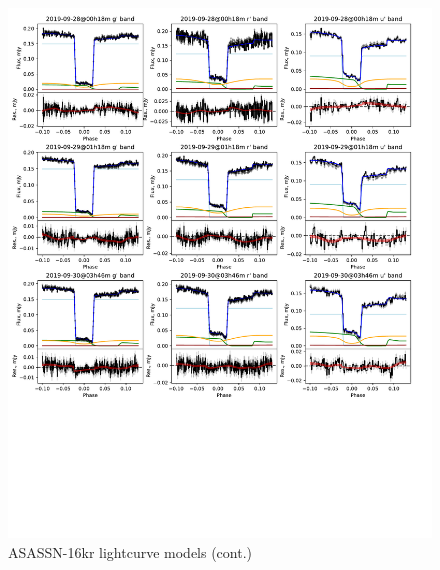 \begin{figure}
    \centering
    \includegraphics[width=\columnwidth, trim={0 10cm 0 0}, clip]{figures/results/three_cvs_with_weird_colours/ASASSN-16kr/ASASSN-16kr_lightcurves_6.pdf}
    \caption{ASASSN-16kr lightcurve models (cont.)}
    \label{fig:ASASSN-16kr all lightcurves cont}
\end{figure}



